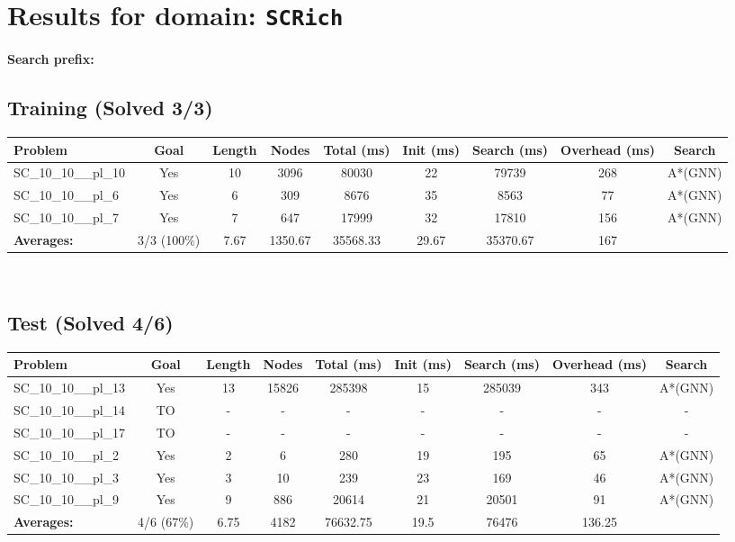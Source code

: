 \documentclass{article}
\begin{document}
\section*{Results for domain: \texttt{SCRich}}
\textbf{Search prefix:} 
\\[0.5cm]
\subsection*{Training (Solved 3/3)}
\begin{tabular}{lcccccccc}
\toprule
Problem & Goal & Length & Nodes & Total (ms) & Init (ms) & Search (ms) & Overhead (ms) & Search \\
\midrule
SC\_10\_10\_\_pl\_10 & Yes & 10 & 3096 & 80030 & 22 & 79739 & 268 & A*(GNN) \\
SC\_10\_10\_\_pl\_6 & Yes & 6 & 309 & 8676 & 35 & 8563 & 77 & A*(GNN) \\
SC\_10\_10\_\_pl\_7 & Yes & 7 & 647 & 17999 & 32 & 17810 & 156 & A*(GNN) \\
\textbf{Averages:} & 3/3 (100\%) & 7.67 & 1350.67 & 35568.33 & 29.67 & 35370.67 & 167 & \\
\bottomrule
\end{tabular}
\\[0.7cm]
\subsection*{Test (Solved 4/6)}
\begin{tabular}{lcccccccc}
\toprule
Problem & Goal & Length & Nodes & Total (ms) & Init (ms) & Search (ms) & Overhead (ms) & Search \\
\midrule
SC\_10\_10\_\_pl\_13 & Yes & 13 & 15826 & 285398 & 15 & 285039 & 343 & A*(GNN) \\
SC\_10\_10\_\_pl\_14 & TO & - & - & - & - & - & - & - \\
SC\_10\_10\_\_pl\_17 & TO & - & - & - & - & - & - & - \\
SC\_10\_10\_\_pl\_2 & Yes & 2 & 6 & 280 & 19 & 195 & 65 & A*(GNN) \\
SC\_10\_10\_\_pl\_3 & Yes & 3 & 10 & 239 & 23 & 169 & 46 & A*(GNN) \\
SC\_10\_10\_\_pl\_9 & Yes & 9 & 886 & 20614 & 21 & 20501 & 91 & A*(GNN) \\
\textbf{Averages:} & 4/6 (67\%) & 6.75 & 4182 & 76632.75 & 19.5 & 76476 & 136.25 & \\
\bottomrule
\end{tabular}
\\[0.7cm]
\end{document}
